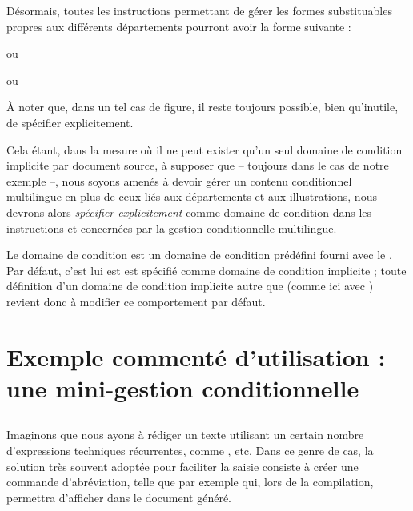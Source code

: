 \documentclass{article}
\begin{document}
Désormais, toutes les instructions  permettant de gérer les formes substituables propres aux différents départements pourront avoir la forme suivante :

\begin{codeblock}
\end{codeblock}

\resumepar ou

\begin{codeblock}
\end{codeblock}

\resumepar ou

\begin{codeblock}
\end{codeblock}

À noter que, dans un tel cas de figure, il reste toujours possible, bien qu'inutile, de spécifier  explicitement.

Cela étant, dans la mesure où il ne peut exister qu'un seul domaine de condition implicite par document source, à supposer que -- toujours dans le cas de notre exemple --, nous soyons amenés à devoir gérer un contenu conditionnel multilingue en plus de ceux liés aux départements et aux illustrations, nous devrons alors \emph{spécifier  explicitement} comme domaine de condition dans les instructions  et  concernées par la gestion conditionnelle multilingue.

Le domaine de condition  est un domaine de condition prédéfini fourni avec le . Par défaut, c'est lui est est spécifié comme domaine de condition implicite ; toute définition d'un domaine de condition implicite autre que  (comme ici avec ) revient donc à modifier ce comportement par défaut.

\section{Exemple commenté d'utilisation  : une mini-gestion conditionnelle}
\subsection{}
Imaginons que nous ayons à rédiger un texte utilisant un certain nombre d'expressions techniques récurrentes, comme ,  etc. Dans ce genre de cas, la solution très souvent adoptée pour faciliter la saisie consiste à créer une commande d'abréviation, telle que par exemple  qui, lors de la compilation, permettra d'afficher  dans le document généré.
\end{document}
